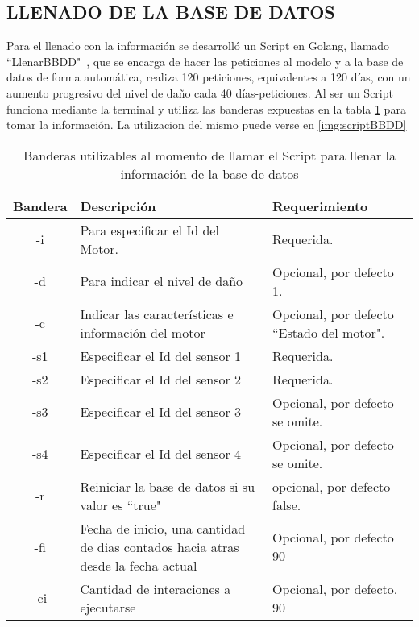 \subsection{LLENADO DE LA BASE DE DATOS}
    Para el llenado con la información se desarrolló un Script en Golang,
    llamado ``LlenarBBDD"\ , que
    se encarga de hacer las peticiones al modelo y a la base de datos de forma
    automática, realiza 120 peticiones, equivalentes a 120 días, con un aumento
    progresivo del nivel de daño cada 40 días-peticiones. Al ser un Script funciona
    mediante la terminal y utiliza las banderas expuestas en la tabla
    \ref{tab:BanderasLLenadoBBDD} para tomar la información. La utilizacion del
    mismo puede verse en \ref{img:scriptBBDD}

\begin{table}[ht]
        \begin{center}
        \caption[Banderas Script para el llenado de la BBDD]{
        Banderas utilizables al momento de llamar el Script para llenar la información
        de la base de datos}
        \label{tab:BanderasLLenadoBBDD}

            \vspace{0.3cm}
            \begin{tabular}{|c|p{7cm}|p{5cm}|}
                \hline
                Bandera & Descripción & Requerimiento \\\hline
                -i & Para especificar el Id del Motor. & Requerida.\\\hline
                -d & Para indicar el nivel de daño  & Opcional, por defecto 1.\\\hline
                -c & Indicar las características e información del motor & Opcional, por defecto ``Estado del motor".\\\hline
                -s1& Especificar el Id del sensor 1 &Requerida.\\\hline
                -s2& Especificar el Id del sensor 2 &Requerida.\\\hline
                -s3& Especificar el Id del sensor 3 & Opcional, por defecto se omite.\\\hline
                -s4& Especificar el Id del sensor 4  &Opcional, por defecto se omite.\\\hline
                -r & Reiniciar la base de datos si su valor es ``true"& opcional, por defecto false.\\\hline
                -fi& Fecha de inicio, una cantidad de dias contados hacia atras desde la fecha actual& Opcional, por defecto 90\\\hline
                -ci& Cantidad de interaciones a ejecutarse&Opcional, por defecto, 90
                \\\hline
            \end{tabular}
        \end{center}
    \end{table}

